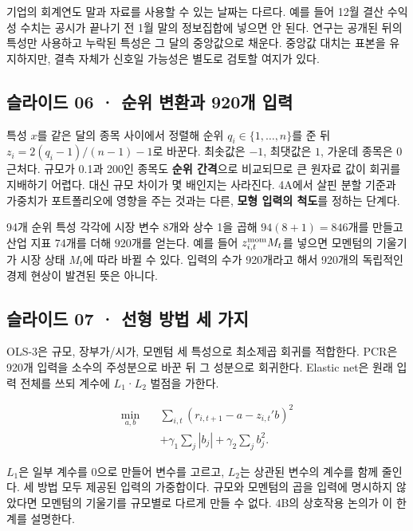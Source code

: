 \documentclass[11pt,a4paper]{article}
\begin{document}
기업의 회계연도 말과 자료를 사용할 수 있는 날짜는 다르다. 예를 들어 12월 결산 수익성 수치는 공시가 끝나기 전 1월 말의 정보집합에 넣으면 안 된다. 연구는 공개된 뒤의 특성만 사용하고 누락된 특성은 그 달의 중앙값으로 채운다. 중앙값 대치는 표본을 유지하지만, 결측 자체가 신호일 가능성은 별도로 검토할 여지가 있다.\par

\subsection{슬라이드 06 · 순위 변환과 920개 입력}
특성 $x$를 같은 달의 종목 사이에서 정렬해 순위 $q_i\in\{1,\ldots,n\}$를 준 뒤 $z_i=2(q_i-1)/(n-1)-1$로 바꾼다. 최솟값은 $-1$, 최댓값은 $1$, 가운데 종목은 0 근처다. 규모가 0.1과 200인 종목도 \textbf{순위 간격}으로 비교되므로 큰 원자료 값이 회귀를 지배하기 어렵다. 대신 규모 차이가 몇 배인지는 사라진다. 4A에서 살핀 분할 기준과 가중치가 포트폴리오에 영향을 주는 것과는 다른, \textbf{모형 입력의 척도}를 정하는 단계다.\par

94개 순위 특성 각각에 시장 변수 8개와 상수 1을 곱해 $94(8+1)=846$개를 만들고 산업 지표 74개를 더해 $920$개를 얻는다. 예를 들어 $z^{\rm mom}_{i,t}M_t$를 넣으면 모멘텀의 기울기가 시장 상태 $M_t$에 따라 바뀔 수 있다. 입력의 수가 920개라고 해서 920개의 독립적인 경제 현상이 발견된 뜻은 아니다.\par

\subsection{슬라이드 07 · 선형 방법 세 가지}
OLS-3은 규모, 장부가/시가, 모멘텀 세 특성으로 최소제곱 회귀를 적합한다. PCR은 920개 입력을 소수의 주성분으로 바꾼 뒤 그 성분으로 회귀한다. Elastic net은 원래 입력 전체를 쓰되 계수에 $L_1$·$L_2$ 벌점을 가한다.\par

\[
\begin{aligned}
\min_{a,b}\quad&\sum_{i,t}(r_{i,t+1}-a-z_{i,t}'b)^2\\
&+\gamma_1\sum_j|b_j|+\gamma_2\sum_j b_j^2.
\end{aligned}
\]

$L_1$은 일부 계수를 0으로 만들어 변수를 고르고, $L_2$는 상관된 변수의 계수를 함께 줄인다. 세 방법 모두 제공된 입력의 가중합이다. 규모와 모멘텀의 곱을 입력에 명시하지 않았다면 모멘텀의 기울기를 규모별로 다르게 만들 수 없다. 4B의 상호작용 논의가 이 한계를 설명한다.\par
\end{document}
